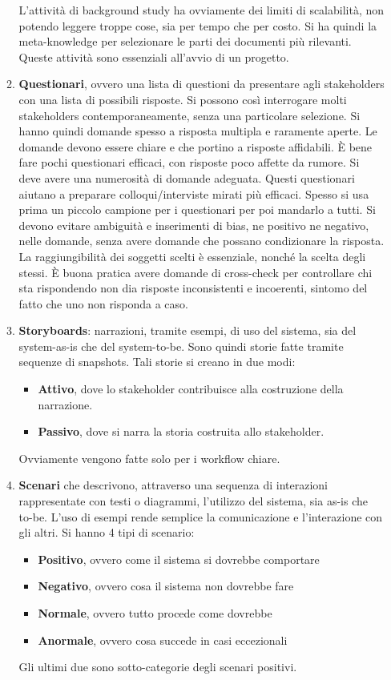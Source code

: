 \begin{itemize}
\begin{enumerate}
        L'attività di background study ha ovviamente dei limiti di scalabilità, non potendo leggere troppe cose, sia per tempo che per costo. Si ha quindi la meta-knowledge per selezionare le parti dei documenti più rilevanti. Queste attività sono essenziali all'avvio di un progetto.
        \item \textbf{Questionari}, ovvero una lista di questioni da presentare agli stakeholders con una lista di possibili risposte. Si possono così interrogare molti stakeholders contemporaneamente, senza una particolare selezione. Si hanno quindi domande spesso a risposta multipla e raramente aperte. Le domande devono essere chiare e che portino a risposte affidabili. È bene fare pochi questionari efficaci, con risposte poco affette da rumore. Si deve avere una numerosità di domande adeguata. Questi questionari aiutano a preparare colloqui/interviste mirati più efficaci. Spesso si usa prima un piccolo campione per i questionari per poi mandarlo a tutti. Si devono evitare ambiguità e inserimenti di bias, ne positivo ne negativo, nelle domande, senza avere domande che possano condizionare la risposta. La raggiungibilità dei soggetti scelti è essenziale, nonché la scelta degli stessi. È buona pratica avere domande di cross-check per controllare chi sta rispondendo non dia risposte inconsistenti e incoerenti, sintomo del fatto che uno non risponda a caso.
        \item \textbf{Storyboards}: narrazioni, tramite esempi, di uso del sistema, sia del system-as-is che del system-to-be. Sono quindi storie fatte tramite sequenze di snapshots. Tali storie si creano in due modi:
        \begin{itemize}
            \item \textbf{Attivo}, dove lo stakeholder contribuisce alla costruzione della narrazione.
            \item \textbf{Passivo}, dove si narra la storia costruita allo stakeholder.
        \end{itemize}
        Ovviamente vengono fatte solo per i workflow chiare.
        \item \textbf{Scenari} che descrivono, attraverso una sequenza di interazioni rappresentate con testi o diagrammi, l'utilizzo del sistema, sia as-is che to-be. L'uso di esempi rende semplice la comunicazione e l'interazione con gli altri. Si hanno 4 tipi di scenario:
        \begin{itemize}
            \item \textbf{Positivo}, ovvero come il sistema si dovrebbe comportare
            \item \textbf{Negativo}, ovvero cosa il sistema non dovrebbe fare
            \item \textbf{Normale}, ovvero tutto procede come dovrebbe
            \item \textbf{Anormale}, ovvero cosa succede in casi eccezionali
        \end{itemize}
        Gli ultimi due sono sotto-categorie degli scenari positivi. 
        

\end{enumerate}
\end{itemize}
